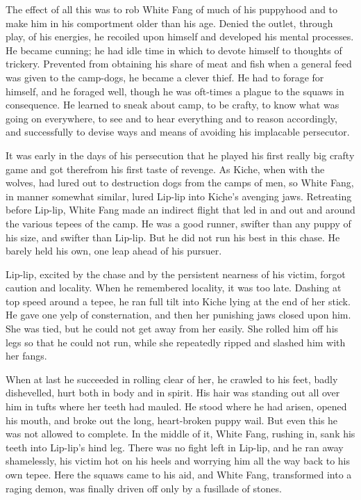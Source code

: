 \documentclass[10pt]{book}
\begin{document}
The effect of all this was to rob White Fang of much of his puppyhood
and to make him in his comportment older than his age. Denied the
outlet, through play, of his energies, he recoiled upon himself and
developed his mental processes. He became cunning; he had idle time in
which to devote himself to thoughts of trickery. Prevented from
obtaining his share of meat and fish when a general feed was given to
the camp-dogs, he became a clever thief. He had to forage for himself,
and he foraged well, though he was oft-times a plague to the squaws in
consequence. He learned to sneak about camp, to be crafty, to know what
was going on everywhere, to see and to hear everything and to reason
accordingly, and successfully to devise ways and means of avoiding his
implacable persecutor.

It was early in the days of his persecution that he played his first
really big crafty game and got therefrom his first taste of revenge.
As Kiche, when with the wolves, had lured out to destruction dogs from
the camps of men, so White Fang, in manner somewhat similar, lured
Lip-lip into Kiche’s avenging jaws. Retreating before Lip-lip, White
Fang made an indirect flight that led in and out and around the various
tepees of the camp. He was a good runner, swifter than any puppy of his
size, and swifter than Lip-lip. But he did not run his best in this
chase. He barely held his own, one leap ahead of his pursuer.

Lip-lip, excited by the chase and by the persistent nearness of his
victim, forgot caution and locality. When he remembered locality, it
was too late. Dashing at top speed around a tepee, he ran full tilt
into Kiche lying at the end of her stick. He gave one yelp of
consternation, and then her punishing jaws closed upon him. She was
tied, but he could not get away from her easily. She rolled him off his
legs so that he could not run, while she repeatedly ripped and slashed
him with her fangs.

When at last he succeeded in rolling clear of her, he crawled to his
feet, badly dishevelled, hurt both in body and in spirit. His hair was
standing out all over him in tufts where her teeth had mauled. He stood
where he had arisen, opened his mouth, and broke out the long,
heart-broken puppy wail. But even this he was not allowed to complete.
In the middle of it, White Fang, rushing in, sank his teeth into
Lip-lip’s hind leg. There was no fight left in Lip-lip, and he ran away
shamelessly, his victim hot on his heels and worrying him all the way
back to his own tepee. Here the squaws came to his aid, and White Fang,
transformed into a raging demon, was finally driven off only by a
fusillade of stones.
\end{document}
